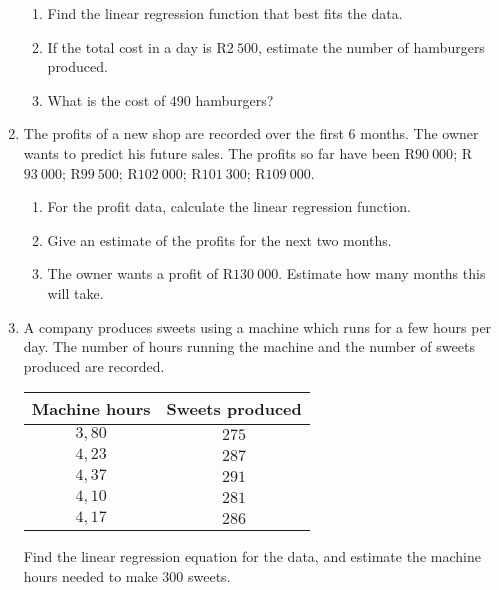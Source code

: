 \begin{eocexercises}{}
\begin{enumerate}
\begin{enumerate}
\item Find the linear regression function that best fits the data.

\item If the total cost in a day is R$2~500$, estimate the number of hamburgers produced.

\item What is the cost of $490$ hamburgers?

\end{enumerate}

\item
The profits of a new shop are recorded over the first 6 months. The owner wants to predict his future sales. The profits so far have been R$90~000$; R$93~000$; R$99~500$; R$102~000$; R$101~300$; R$109~000$. 

\begin{enumerate}
\item For the profit data, calculate the linear regression function.

\item Give an estimate of the profits for the next two months.

\item The owner wants a profit of R$130~000$. Estimate how many months this will take.
\end{enumerate}

\item
A company produces sweets using a machine which runs for a few hours per day. The number of hours running the machine and the number of sweets produced are recorded.

\begin{tabular}{|c|c|}
\hline
Machine hours & Sweets produced\\
\hline
$3,80$ & $275$ \\ \hline
$4,23$ & $287$ \\ \hline
$4,37$ & $291$ \\ \hline
$4,10$ & $281$ \\ \hline
$4,17$ & $286$ \\ 
\hline

\hline
\end{tabular}

Find the linear regression equation for the data, and estimate the machine hours needed to make $300$ sweets.


\end{enumerate}





\practiceinfo
\end{eocexercises}
